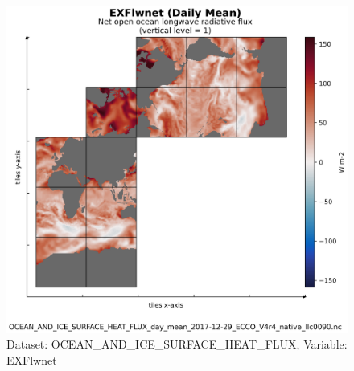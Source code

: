 \begin{figure}[H]
\centering
\includegraphics[scale=0.55]{../images/plots/v4r4/native_plots/Ocean_and_Sea-Ice_Surface_Heat_Fluxes/EXFlwnet.png}
\caption{Dataset: OCEAN\_AND\_ICE\_SURFACE\_HEAT\_FLUX, Variable: EXFlwnet}
\label{tab:table-OCEAN_AND_ICE_SURFACE_HEAT_FLUX_EXFlwnet-Plot}
\end{figure}
\newpage
\pagebreak
